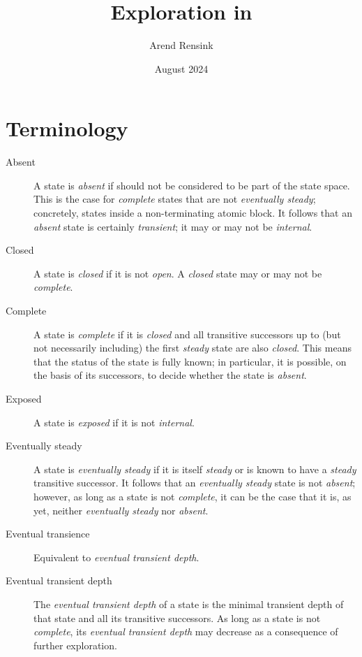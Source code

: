 \documentclass{article}
\begin{document}
\title{Exploration in \GROOVE}
\author{Arend Rensink}
\date{August 2024}
\maketitle

\section*{Terminology}

\begin{description}
\item[Absent] A state is \emph{absent} if should not be considered to be part of the state space. This is the case for \emph{complete} states that are not \emph{eventually steady}; concretely, states inside a non-terminating atomic block. It follows that an \emph{absent} state is certainly \emph{transient}; it may or may not be \emph{internal}.

\item[Closed] A state is \emph{closed} if it is not \emph{open}. A \emph{closed} state may or may not be \emph{complete}.

\item[Complete] A state is \emph{complete} if it is \emph{closed} and all transitive successors up to (but not necessarily including) the first \emph{steady} state are also \emph{closed}. This means that the status of the state is fully known; in particular, it is possible, on the basis of its successors, to decide whether the state is \emph{absent}.

\item[Exposed] A state is \emph{exposed} if it is not \emph{internal}.

\item[Eventually steady] A state is \emph{eventually steady} if it is itself \emph{steady} or is known to have a \emph{steady} transitive successor. It follows that an \emph{eventually steady} state is not \emph{absent}; however, as long as a state is not \emph{complete}, it can be the case that it is, as yet, neither \emph{eventually steady} nor \emph{absent}.

\item[Eventual transience] Equivalent to \emph{eventual transient depth}.

\item[Eventual transient depth] The \emph{eventual transient depth} of a state is the minimal transient depth of that state and all its transitive successors. As long as a state is not \emph{complete}, its \emph{eventual transient depth} may decrease as a consequence of further exploration.


\end{description}
\end{document}
